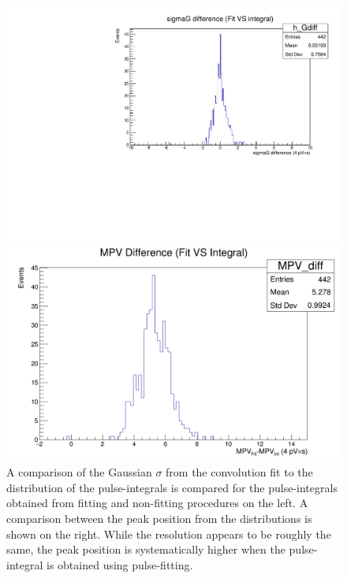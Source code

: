 \documentclass[twoside]{article}
\begin{document}
\begin{figure}[hbt]
\begin{minipage}{0.5\textwidth}
 \includegraphics[width=\textwidth]{pics/cosmicGdiff.pdf}
\end{minipage}\hfill\begin{minipage}{0.5\textwidth}
 \includegraphics[width=\textwidth]{pics/cosmicMPVdiff.png}
 \end{minipage}
  \caption{A comparison of the Gaussian $\sigma$ from the convolution fit to the distribution of the pulse-integrals is compared for the pulse-integrals obtained from fitting and non-fitting procedures on the left. A comparison between the peak position from the distributions is shown on the right. While the resolution appears to be roughly the same, the peak position is systematically higher when the pulse-integral is obtained using pulse-fitting.}
  \label{fig:compare}
\end{figure}
\end{document}
